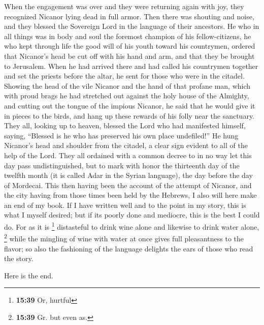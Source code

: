  When the engagement was over and they were returning
again with joy, they recognized Nicanor lying dead in full armor.
 Then there was shouting and noise, and they blessed the
Sovereign Lord in the language of their ancestors.  He
who in all things was in body and soul the foremost champion of his
fellow-citizens, he who kept through life the good will of his youth
toward his countrymen, ordered that Nicanor's head be cut off with his
hand and arm, and that they be brought to Jerusalem. 
When he had arrived there and had called his countrymen together and set
the priests before the altar, he sent for those who were in the citadel.
 Showing the head of the vile Nicanor and the hand of
that profane man, which with proud brags he had stretched out against
the holy house of the Almighty,  and cutting out the
tongue of the impious Nicanor, he said that he would give it in pieces
to the birds, and hang up these rewards of his folly near the sanctuary.
 They all, looking up to heaven, blessed the Lord who had
manifested himself, saying, ``Blessed is he who has preserved his own
place undefiled!''  He hung Nicanor's head and shoulder
from the citadel, a clear sign evident to all of the help of the Lord.
 They all ordained with a common decree to in no way let
this day pass undistinguished, but to mark with honor the thirteenth day
of the twelfth month (it is called Adar in the Syrian language), the day
before the day of Mordecai.  This then having been the
account of the attempt of Nicanor, and the city having from those times
been held by the Hebrews, I also will here make an end of my book.
 If I have written well and to the point in my story,
this is what I myself desired; but if its poorly done and mediocre, this
is the best I could do.  For as it is \footnote{\textbf{15:39}
  Or, hurtful} distasteful to drink wine alone and likewise to drink
water alone, \footnote{\textbf{15:39} Gr. but even as.} while the
mingling of wine with water at once gives full pleasantness to the
flavor; so also the fashioning of the language delights the ears of
those who read the story.

Here is the end.
